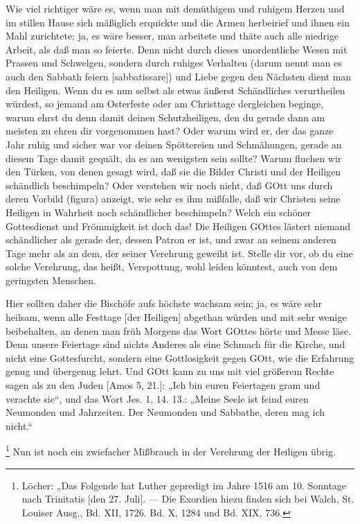 Wie viel richtiger wäre es, wenn man mit demüthigem und ruhigem Herzen und im stillen Hause sich mäßiglich erquickte und die Armen herbeirief und ihnen ein Mahl zurichtete; ja, es wäre besser, man arbeitete und thäte auch alle niedrige Arbeit, als daß man so feierte. Denn nicht durch dieses unordentliche Wesen mit Prassen und Schwelgen, sondern durch ruhiges Verhalten (darum nennt man es auch den Sabbath feiern [sabbatissare]) und Liebe gegen den Nächsten dient man den Heiligen. Wenn du es nun selbst als etwas äußerst Schändliches verurtheilen würdest, so jemand am Osterfeste oder am Christtage dergleichen beginge, warum ehrst du denn damit deinen Schutzheiligen, den du gerade dann am meisten zu ehren dir vorgenommen hast? Oder warum wird er, der das ganze Jahr ruhig und sicher war vor deinen Spöttereien und Schmähungen, gerade an diesem Tage damit gequält, da es am wenigsten sein sollte? Warum fluchen wir den Türken, von denen gesagt wird, daß sie die Bilder Christi und der Heiligen schändlich beschimpeln? Oder verstehen wir noch nicht, daß GOtt uns durch deren Vorbild (figura) anzeigt, wie sehr es ihm mißfalle, daß wir Christen seine Heiligen in Wahrheit noch schändlicher beschimpeln? Welch ein schöner Gottesdienst und Frömmigkeit ist doch das! Die Heiligen GOttes lästert niemand schändlicher als gerade der, dessen Patron er ist, und zwar an seinem anderen Tage mehr als an dem, der seiner Verehrung geweiht ist. Stelle dir vor, ob du eine solche Verehrung, das heißt, Verspottung, wohl leiden könntest, auch von dem geringsten Menschen.

Hier sollten daher die Bischöfe aufs höchste wachsam sein; ja, es wäre sehr heilsam, wenn alle Festtage [der Heiligen] abgethan würden und mit sehr wenige beibehalten, an denen man früh Morgens das Wort GOttes hörte und Messe läse. Denn unsere Feiertage sind nichts Anderes als eine Schmach für die Kirche, und nicht eine Gottesfurcht, sondern eine Gottlosigkeit gegen GOtt, wie die Erfahrung genug und übergenug lehrt. Und GOtt kann zu uns mit viel größerem Rechte sagen als zu den Juden [Amos 5, 21.]: „Ich bin euren Feiertagen gram und verachte sie“, und das Wort Jes. 1, 14. 13.: „Meine Seele ist feind euren Neumonden und Jahrzeiten. Der Neumonden und Sabbathe, deren mag ich nicht.“

\footnote{Löcher: „Das Folgende hat Luther gepredigt im Jahre 1516 am 10. Sonntage nach Trinitatis [den 27. Juli]. — Die Exordien hiezu finden sich bei Walch, St. Louiser Ausg., Bd. XII, 1726. Bd. X, 1284 und Bd. XIX, 736.} Nun ist noch ein zwiefacher Mißbrauch in der Verehrung der Heiligen übrig.


